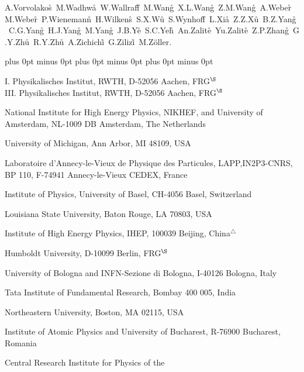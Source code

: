\documentclass[12pt,a4paper,dvips]{article}
\begin{document}
{A.Vorvolakos\r\tute\cyprus\
M.Wadhwa\r\tute\basel\
W.Wallraff\r\tute\aachen\ 
M.Wang\r\tute\mit\
X.L.Wang\r\tute\hefei\ 
Z.M.Wang\r\tute{\hefei}\
A.Weber\r\tute\aachen\
M.Weber\r\tute\aachen\
P.Wienemann\r\tute\aachen\
H.Wilkens\r\tute\nymegen\
S.X.Wu\r\tute\mit\
S.Wynhoff\r\tute\cern\ 
L.Xia\r\tute\caltech\ 
Z.Z.Xu\r\tute\hefei\ 
B.Z.Yang\r\tute\hefei\ 
C.G.Yang\r\tute\beijing\ 
H.J.Yang\r\tute\beijing\
M.Yang\r\tute\beijing\
J.B.Ye\r\tute{\hefei}\
S.C.Yeh\r\tute\tsinghua\ 
An.Zalite\r\tute\peters\
Yu.Zalite\r\tute\peters\
Z.P.Zhang\r\tute{\hefei}\ 
G.Y.Zhu\r\tute\beijing\
R.Y.Zhu\r\tute\caltech\
A.Zichichi\r\tute{\bologna,\cern,\wl}\
G.Zilizi\r\tute{\alabama,\P}\
M.Z{\"o}ller\rlap.\tute\aachen
\newpage
\begin{list}{A}{\itemsep=0pt plus 0pt minus 0pt\parsep=0pt plus 0pt minus 0pt
                \topsep=0pt plus 0pt minus 0pt}
\item[\aachen]
 I. Physikalisches Institut, RWTH, D-52056 Aachen, FRG$^{\S}$\\
 III. Physikalisches Institut, RWTH, D-52056 Aachen, FRG$^{\S}$
\item[\nikhef] National Institute for High Energy Physics, NIKHEF, 
     and University of Amsterdam, NL-1009 DB Amsterdam, The Netherlands
\item[\mich] University of Michigan, Ann Arbor, MI 48109, USA
\item[\lapp] Laboratoire d'Annecy-le-Vieux de Physique des Particules, 
     LAPP,IN2P3-CNRS, BP 110, F-74941 Annecy-le-Vieux CEDEX, France
\item[\basel] Institute of Physics, University of Basel, CH-4056 Basel,
     Switzerland
\item[\lsu] Louisiana State University, Baton Rouge, LA 70803, USA
\item[\beijing] Institute of High Energy Physics, IHEP, 
  100039 Beijing, China$^{\triangle}$ 
\item[\berlin] Humboldt University, D-10099 Berlin, FRG$^{\S}$
\item[\bologna] University of Bologna and INFN-Sezione di Bologna, 
     I-40126 Bologna, Italy
\item[\tata] Tata Institute of Fundamental Research, Bombay 400 005, India
\item[\ne] Northeastern University, Boston, MA 02115, USA
\item[\bucharest] Institute of Atomic Physics and University of Bucharest,
     R-76900 Bucharest, Romania
\item[\budapest] Central Research Institute for Physics of the 

\end{list}}
\end{document}
